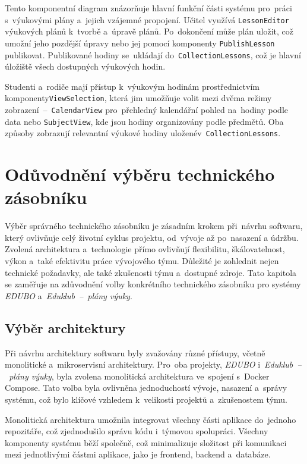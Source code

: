 \documentclass[male,czech,api_bc]{kitheses}
\begin{document}
Tento komponentní diagram znázorňuje hlavní funkční části systému pro~práci s~výukovými plány a~jejich vzájemné propojení. Učitel využívá \texttt{LessonEditor} výukových plánů k~tvorbě a~úpravě plánů. Po~dokončení může plán uložit, což umožní jeho pozdější úpravy nebo jej pomocí komponenty \texttt{PublishLesson} publikovat. Publikované hodiny se~ukládají do~\texttt{CollectionLessons}, což je hlavní úložiště všech dostupných výukových hodin.

Studenti a~rodiče mají přístup k~výukovým hodinám prostřednictvím komponenty\break\texttt{ViewSelection}, která jim umožňuje volit mezi dvěma režimy zobrazení~--~\texttt{CalendarView} pro~přehledný kalendářní pohled na~hodiny podle data nebo \texttt{SubjectView}, kde jsou hodiny organizovány podle předmětů. Oba způsoby zobrazují relevantní výukové hodiny uložené\break v~\texttt{CollectionLessons}.


\section{Odůvodnění výběru technického zásobníku}

Výběr správného technického zásobníku je zásadním krokem při~návrhu softwaru, který ovlivňuje celý životní cyklus projektu, od~vývoje až po~nasazení a údržbu. Zvolená architektura a~technologie přímo ovlivňují flexibilitu, škálovatelnost, výkon a~také efektivitu práce vývojového týmu. Důležité je zohlednit nejen technické požadavky, ale také zkušenosti týmu a~dostupné zdroje. Tato kapitola se zaměřuje na zdůvodnění volby konkrétního technického zásobníku pro systémy \textit{EDUBO} a~\textit{Eduklub~--~plány výuky}.

\subsection{Výběr architektury}

Při návrhu architektury softwaru byly zvažovány různé přístupy, včetně monolitické a~mikroservisní architektury. Pro~oba projekty, \textit{EDUBO} i~\textit{Eduklub~--~plány výuky}, byla zvolena monolitická architektura ve~spojení s~Docker Compose. Tato volba byla ovlivněna jednoduchostí vývoje, nasazení a~správy systému, což bylo klíčové vzhledem k~velikosti projektů a~zkušenostem týmu.

Monolitická architektura umožnila integrovat všechny části aplikace do~jednoho repozitáře, což zjednodušilo správu kódu i~týmovou spolupráci. Všechny komponenty systému běží společně, což minimalizuje složitost při komunikaci mezi jednotlivými částmi aplikace, jako je frontend, backend a~databáze.
\end{document}
